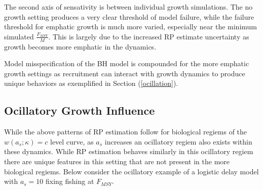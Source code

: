 %
The second axis of sensativity is between individual growth simulations. 
The no growth setting produces a very clear threshold of model failure, while
the failure threshold for emphatic growth is much more varied, especially near 
the minimum simulated $\frac{F_{MSY}}{M}$. %
This is largely due to the increased RP estimate uncertainty as growth becomes 
more emphatic in the dynamics. 

%
Model misspecification of the BH model is compounded for the more emphatic growth settings
as recruitment can interact with growth dynamics to produce unique behaviors as exemplified 
in Section (\ref{ocillation}).





%
\clearpage
\subsection{Ocillatory Growth Influence\label{ocillation}}

%
While the above patterns of RP estimation follow for biological regiems 
of the $w(a_s; \kappa)=c$ level curve, as $a_s$ increases an ocillatory 
regiem also exists within these dynamics. While RP estimation behaves 
similarly in this ocillatory regiem there are unique features in this 
setting that are not present in the more biological regiems. Below 
consider the ocillatory example of a logistic delay model with $a_s=10$ fixing 
fishing at $F_{MSY}$. 

